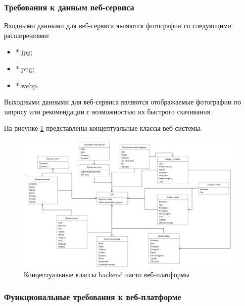 \subsubsection{Требования к данным веб-сервиса}

Входными данными для веб-сервиса являются фотографии со следующими расширениями:

\begin{itemize}
	\item *.jpg;
	\item *.png;
	\item *.webp.
\end{itemize}

Выходными данными для веб-сервиса являются отображаемые фотографии по запросу или рекомендации с возможностью их быстрого скачивания.

На рисунке \ref{fig:-conceptual_classes} представлены концептуальные классы веб-системы.
\begin{figure}
	\centering
	\includegraphics[width=0.7\linewidth]{"images/Концептуальные классы"}
	\caption[Концептуальные классы backend части веб-платформы]{Концептуальные классы backend части веб-платформы}
	\label{fig:-conceptual_classes}
\end{figure}

\subsubsection{Функциональные требования к веб-платформе}

